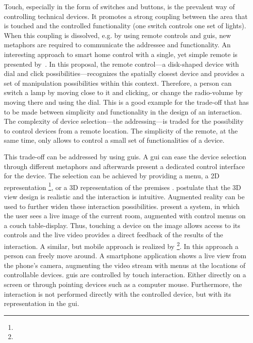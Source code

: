 Touch, especially in the form of switches and buttons, is the prevalent way of controlling technical \glspl{device}.
It promotes a strong coupling between the area that is touched and the controlled functionality (one switch controls one set of lights).
When this coupling is dissolved, e.g. by using remote controls and \glspl{gui}, new metaphors are required to communicate the \gls{addressee} and functionality.
An interesting approach to \gls{smart home} control with a single, yet simple remote is presented by~.
In this proposal, the remote control---a disk-shaped \gls{device} with dial and click possibilities---recognizes the spatially closest \gls{device} and provides a set of manipulation possibilities within this context.
Therefore, a person can switch a lamp by moving close to it and clicking, or change the radio-volume by moving there and using the dial.
This is a good example for the trade-off that has to be made between simplicity and functionality in the design of an interaction.
The complexity of \gls{device} selection---the addressing---is traded for the possibility to control \glspl{device} from a remote location.
The simplicity of the remote, at the same time, only allows to control a small set of functionalities of a \gls{device}.

This trade-off can be addressed by using \glspl{gui}.
A \gls{gui} can ease the \gls{device} selection through different metaphors and afterwards present a dedicated control interface for the \gls{device}.
The selection can be achieved by providing a menu, a 2D representation \cite{Pohling2018}\footnote{}, or a 3D representation of the premises \cite[]{Borodulkin2002}.
\citeauthor*{Borodulkin2002} postulate that the 3D view design is realistic and the interaction is intuitive.
Augmented reality can be used to further widen these interaction possibilities.
 present a system, in which the user sees a live image of the current room, augmented with control menus on a couch table-display.
Thus, touching a \gls{device} on the image allows access to its controls and the live video provides a direct feedback of the results of the interaction.
A similar, but mobile approach is realized by \footnote{}.
In this approach a person can freely move around.
A smartphone application shows a live view from the phone's camera, augmenting the video stream with menus at the locations of controllable \glspl{device}.
\Glspl{gui} are controlled by touch interaction.
Either directly on a screen or through pointing \glspl{device} such as a computer mouse.
Furthermore, the interaction is not performed directly with the controlled \gls{device}, but with its representation in the \gls{gui}.

